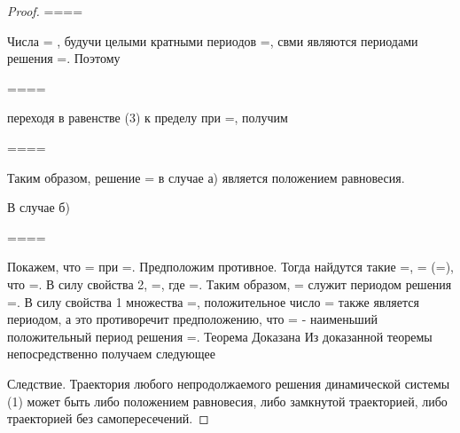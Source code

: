 \documentclass{article}
\theoremstyle{plain} \newtheorem*{theorem*}{Теорема}
\theoremstyle{plain} \newtheorem{theorem}{Теорема}[section]
\begin{document}
\begin{proof}
    ====

    Числа = , будучи целыми кратными периодов =, свми являются периодами
    решения =. Поэтому

    ====

    переходя в равенстве (3) к пределу при =, получим

    ====

    Таким образом, решение = в случае а) является положением равновесия.

    В случае б)

    ====

    Покажем, что = при =. Предположим противное. Тогда найдутся такие
    =, = (=), что =. В силу свойства 2, =, где =. Таким образом,
    = служит периодом решения =. В силу свойства 1 множества =,
    положительное число = также является периодом, а это противоречит
    предположению, что = - наименьший положительный период решения =.
    Теорема Доказана
    Из доказанной теоремы непосредственно получаем следующее

    Следствие. Траектория любого непродолжаемого решения динамической
    системы (1) может быть либо положением равновесия, либо замкнутой
    траекторией, либо траекторией без самопересечений.



\end{proof}
\end{document}
